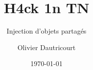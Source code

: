 \documentclass{beamer}
\title[s.o. injection]{H4ck 1n TN}
\subtitle{Injection d'objets partagés}
\author[H4ck1nTN]{Olivier Dautricourt}
\date{\today}
\begin{document}
\begin{frame}
\titlepage
\end{frame} 





\end{document}

